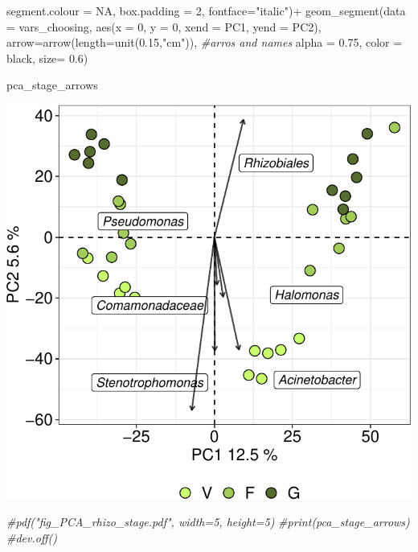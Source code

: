 \documentclass[]{interact}
\theoremstyle{plain}%
\theoremstyle{definition}
\theoremstyle{remark}
\newenvironment{Shaded}{\begin{snugshade}}{\end{snugshade}}
\newcommand{\AttributeTok}[1]{\textcolor[rgb]{0.77,0.63,0.00}{#1}}
\newcommand{\CommentTok}[1]{\textcolor[rgb]{0.56,0.35,0.01}{\textit{#1}}}
\newcommand{\ConstantTok}[1]{\textcolor[rgb]{0.00,0.00,0.00}{#1}}
\newcommand{\DecValTok}[1]{\textcolor[rgb]{0.00,0.00,0.81}{#1}}
\newcommand{\FloatTok}[1]{\textcolor[rgb]{0.00,0.00,0.81}{#1}}
\newcommand{\FunctionTok}[1]{\textcolor[rgb]{0.00,0.00,0.00}{#1}}
\newcommand{\NormalTok}[1]{#1}
\newcommand{\SpecialCharTok}[1]{\textcolor[rgb]{0.00,0.00,0.00}{#1}}
\newcommand{\StringTok}[1]{\textcolor[rgb]{0.31,0.60,0.02}{#1}}
\begin{document}
\begin{Shaded}
\begin{Highlighting}[]
                            \AttributeTok{segment.colour =} \ConstantTok{NA}\NormalTok{, }\AttributeTok{box.padding =} \DecValTok{2}\NormalTok{, }\AttributeTok{fontface=}\StringTok{"italic"}\NormalTok{)}\SpecialCharTok{+}
  \FunctionTok{geom\_segment}\NormalTok{(}\AttributeTok{data =}\NormalTok{ vars\_choosing, }\FunctionTok{aes}\NormalTok{(}\AttributeTok{x =} \DecValTok{0}\NormalTok{, }\AttributeTok{y =} \DecValTok{0}\NormalTok{, }\AttributeTok{xend =}\NormalTok{ PC1, }\AttributeTok{yend =}\NormalTok{ PC2), }
               \AttributeTok{arrow=}\FunctionTok{arrow}\NormalTok{(}\AttributeTok{length=}\FunctionTok{unit}\NormalTok{(}\FloatTok{0.15}\NormalTok{,}\StringTok{"cm"}\NormalTok{)), }\CommentTok{\#arros and names}
               \AttributeTok{alpha =} \FloatTok{0.75}\NormalTok{, }\AttributeTok{color =} \StringTok{\textquotesingle{}black\textquotesingle{}}\NormalTok{, }\AttributeTok{size=} \FloatTok{0.6}\NormalTok{)}

\NormalTok{pca\_stage\_arrows}
\end{Highlighting}
\end{Shaded}

\begin{center}\includegraphics{Doc_pdf_files/figure-latex/unnamed-chunk-35-1} \end{center}

\begin{Shaded}
\begin{Highlighting}[]
\CommentTok{\#pdf("fig\_PCA\_rhizo\_stage.pdf", width=5, height=5)}
\CommentTok{\#print(pca\_stage\_arrows)}
\CommentTok{\#dev.off()}
\end{Highlighting}
\end{Shaded}
\end{document}
